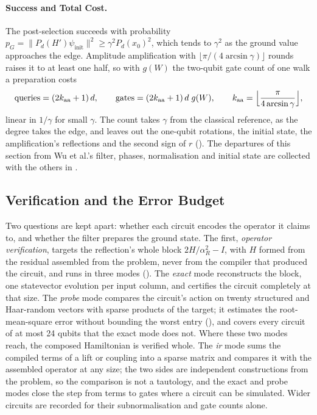 \paragraph{Success and Total Cost.} The post-selection succeeds with probability $p_G=\|P_d(H')\psi_{\mathrm{init}}\|^2\ge\gamma^2P_d(x_0)^2$, which tends to $\gamma^2$ as the ground value approaches the edge. Amplitude amplification \cite{brassard2000amplitude} with $\lfloor\pi/(4\arcsin\gamma)\rfloor$ rounds raises it to at least one half, so with $g(W)$ the two-qubit gate count of one walk a preparation costs
\begin{equation}
    \text{queries}=(2k_{\mathrm{aa}}+1)\,d,
    \qquad
    \text{gates}=(2k_{\mathrm{aa}}+1)\,d\;g(W),
    \qquad
    k_{\mathrm{aa}}=\Bigl\lfloor\frac{\pi}{4\arcsin\gamma}\Bigr\rfloor,
    \label{eq:total-cost}
\end{equation}
linear in $1/\gamma$ for small $\gamma$. The count takes $\gamma$ from the classical reference, as the degree takes the edge, and leaves out the one-qubit rotations, the initial state, the amplification's reflections and the second sign of $r$ (). The departures of this section from Wu et al.'s filter, phases, normalisation and initial state are collected with the others in .

\subsection{Verification and the Error Budget}
\label{sec:pipeline-verification}

Two questions are kept apart: whether each circuit encodes the operator it claims to, and whether the filter prepares the ground state. The first, \emph{operator verification}, targets the reflection's whole block $2H/\alpha_R^2-I$, with $H$ formed from the residual assembled from the problem, never from the compiler that produced the circuit, and runs in three modes (). The \emph{exact} mode reconstructs the block, one statevector evolution per input column, and certifies the circuit completely at that size. The \emph{probe} mode compares the circuit's action on twenty structured and Haar-random vectors with sparse products of the target; it estimates the root-mean-square error without bounding the worst entry (), and covers every circuit of at most 24 qubits that the exact mode does not. Where these two modes reach, the composed Hamiltonian is verified whole. The \emph{\gls{ir}} mode sums the compiled terms of a lift or coupling into a sparse matrix and compares it with the assembled operator at any size; the two sides are independent constructions from the problem, so the comparison is not a tautology, and the exact and probe modes close the step from terms to gates where a circuit can be simulated. Wider circuits are recorded for their subnormalisation and gate counts alone.

